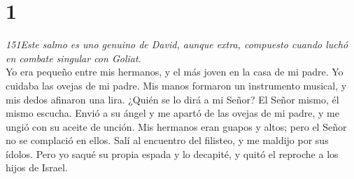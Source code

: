 \hypertarget{section}{%
\section{1}\label{section}}

\emph{151Este salmo es uno genuino de David, aunque extra, compuesto
cuando luchó en combate singular con Goliat.}\\
 Yo era pequeño entre mis hermanos, y el más joven en la
casa de mi padre. Yo cuidaba las ovejas de mi padre.  Mis
manos formaron un instrumento musical, y mis dedos afinaron una lira.
 ¿Quién se lo dirá a mi Señor? El Señor mismo, él mismo
escucha.  Envió a su ángel y me apartó de las ovejas de mi
padre, y me ungió con su aceite de unción.  Mis hermanos
eran guapos y altos; pero el Señor no se complació en ellos.
 Salí al encuentro del filisteo, y me maldijo por sus
ídolos.  Pero yo saqué su propia espada y lo decapité, y
quitó el reproche a los hijos de Israel.
